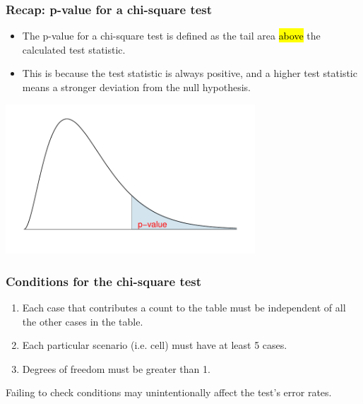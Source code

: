\begin{frame}
\frametitle{Recap: p-value for a chi-square test}

\begin{itemize}

\item The p-value for a chi-square test is defined as the tail area \hl{above} the calculated test statistic.

\item This is because the test statistic is always positive, and a higher test statistic means a stronger deviation from the null hypothesis.

\end{itemize}

\begin{center}
\includegraphics[width=0.7\textwidth]{6-3_chisq_gof/figures/genericChiSquare/genericChiSquare}
\end{center}

\end{frame}


\begin{frame}
\frametitle{Conditions for the chi-square test}

\begin{enumerate}

\item {} Each case that contributes a count to the table must be independent of all the other cases in the table.

\pause

\item {} Each particular scenario (i.e. cell) must have at least 5  cases.

\pause

\item {} Degrees of freedom must be greater than 1.

\end{enumerate}

\pause

Failing to check conditions may unintentionally affect the test's error rates.

\end{frame}

